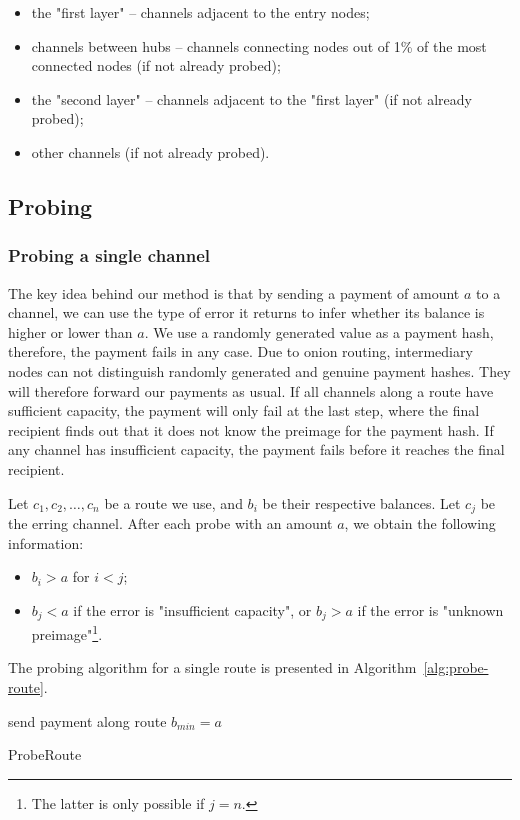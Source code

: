 \begin{itemize}
	\item the "first layer" -- channels adjacent to the entry nodes;
	\item channels between hubs -- channels connecting nodes out of 1\% of the most connected nodes (if not already probed);
	\item the "second layer" -- channels adjacent to the "first layer" (if not already probed);
	\item other channels (if not already probed).
\end{itemize}


\subsection{Probing}

\subsubsection{Probing a single channel}
The key idea behind our method is that by sending a payment of amount $a$ to a channel, we can use the type of error it returns to infer whether its balance is higher or lower than $a$.
We use a randomly generated value as a payment hash, therefore, the payment fails in any case.
Due to onion routing, intermediary nodes can not distinguish randomly generated and genuine payment hashes.
They will therefore forward our payments as usual.
If all channels along a route have sufficient capacity, the payment will only fail at the last step, where the final recipient finds out that it does not know the preimage for the payment hash.
If any channel has insufficient capacity, the payment fails before it reaches the final recipient.

Let $c_1, c_2, \dots, c_n$ be a route we use, and $b_i$ be their respective balances.
Let $c_j$ be the erring channel.
After each probe with an amount $a$, we obtain the following information: 
\begin{itemize}
	\item $b_i > a$ for $i<j$;
	\item $b_j < a$ if the error is "insufficient capacity", or $b_j > a$ if the error is "unknown preimage"\footnote{The latter is only possible if $j=n$.}.
\end{itemize}

The probing algorithm for a single route is presented in Algorithm~\ref{alg:probe-route}.

\begin{algorithm}
	send payment along route\;
	 {
		$b_{min} = a$\;
	}
	\caption{ProbeRoute}
	\label{alg:probe-route}
\end{algorithm}

